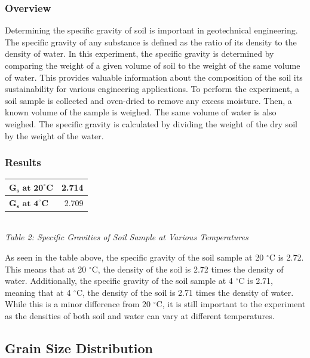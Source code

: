 \documentclass{article}
\begin{document}
\subsubsection{Overview}
\par Determining the specific gravity of soil is important in geotechnical engineering. The specific gravity of any substance is defined as the ratio of its density to the density of water. In this experiment, the specific gravity is determined by comparing the weight of a given volume of soil to the weight of the same volume of water. This provides valuable information about the composition of the soil its sustainability for various engineering applications. To perform the experiment, a soil sample is collected and oven-dried to remove any excess moisture. Then, a known volume of the sample is weighed. The same volume of water is also weighed. The specific gravity is calculated by dividing the weight of the dry soil by the weight of the water. 
\subsubsection{Results}
\begin{center}
    \begin{tabular}{|l|r|}
        \hline 
        $\bm{G_s \textbf{ at } 20^\circ\textbf{C}}$ & 2.714\\\hline
        $\bm{G_s \textbf{ at } 4^\circ\textbf{C}}$ & 2.709\\\hline
    \end{tabular}
    \vspace{3mm}
    \emph{\\Table 2: Specific Gravities of Soil Sample at Various Temperatures}
\end{center}
\par As seen in the table above, the specific gravity of the soil sample at 20 $^\circ$C is 2.72. This means that at 20 $^\circ$C, the density of the soil is 2.72 times the density of water. Additionally, the specific gravity of the soil sample at 4 $^\circ$C is 2.71, meaning that at 4 $^\circ$C, the density of the soil is 2.71 times the density of water. While this is a minor difference from 20 $^\circ$C, it is still important to the experiment as the densities of both soil and water can vary at different temperatures.  
\newpage
\subsection{Grain Size Distribution}
\end{document}
